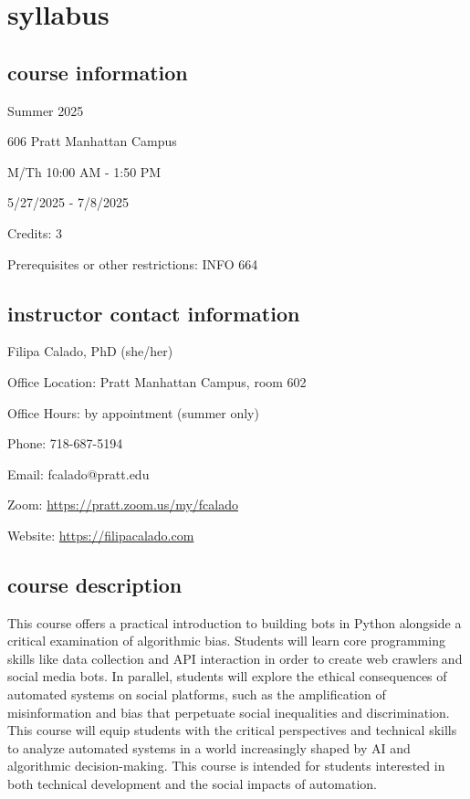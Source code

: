 \documentclass[11pt]{article}
\author{fcalado}
\date{\today}
\title{}
\begin{document}
\tableofcontents

\section{syllabus}
\label{sec:org48cc3ba}
\subsection{course information}
\label{sec:org358bd5d}
Summer 2025

606 Pratt Manhattan Campus 

M/Th 10:00 AM - 1:50 PM

5/27/2025 - 7/8/2025

Credits: 3

Prerequisites or other restrictions: INFO 664

\subsection{instructor contact information}
\label{sec:org2583913}
Filipa Calado, PhD (she/her)

Office Location: Pratt Manhattan Campus, room 602

Office Hours: by appointment (summer only)

Phone: 718-687-5194

Email: fcalado@pratt.edu

Zoom: \url{https://pratt.zoom.us/my/fcalado}

Website: \url{https://filipacalado.com} 

\subsection{course description}
\label{sec:org7c1a7fc}
This course offers a practical introduction to building bots in Python
alongside a critical examination of algorithmic bias. Students will
learn core programming skills like data collection and API interaction
in order to create web crawlers and social media bots. In parallel,
students will explore the ethical consequences of automated systems on
social platforms, such as the amplification of misinformation and bias
that perpetuate social inequalities and discrimination. This course
will equip students with the critical perspectives and technical
skills to analyze automated systems in a world increasingly shaped by
AI and algorithmic decision-making. This course is intended for
students interested in both technical development and the social
impacts of automation.
\end{document}
